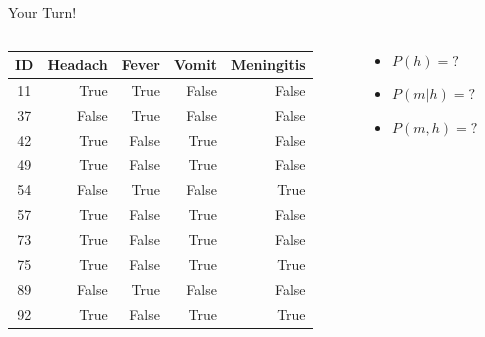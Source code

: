 \documentclass[xcolor={table}]{beamer}
\begin{document}
\begin{frame} 
 \begin{block}{Your Turn!}
 \begin{columns}
\begin{column}{0.7\textwidth}
\begin{footnotesize}
\begin{tabular}{crrrr}
\hline
\textbf{ID} & \textbf{Headach} & \textbf{Fever} & \textbf{Vomit} & \textbf{Meningitis}\\
\hline
11 & True & True & False & False\\
37 & False & True & False & False\\
42 & True & False & True & False\\
49 & True & False & True & False\\
54 & False & True & False & True\\
57 & True & False & True & False\\
73 & True & False & True & False\\
75 & True & False & True & True\\
89 & False & True & False & False\\
92 & True & False & True & True\\
\hline
\end{tabular}
\end{footnotesize}
\end{column}
\begin{column}{0.3\textwidth}
	\begin{itemize}
		\item $P(h) = ?$
		\item $P(m|h) = ?$
		\item $P(m,h) = ?$
	\end{itemize}
\end{column}
\end{columns}
\end{block}
\end{frame} 
\end{document}
